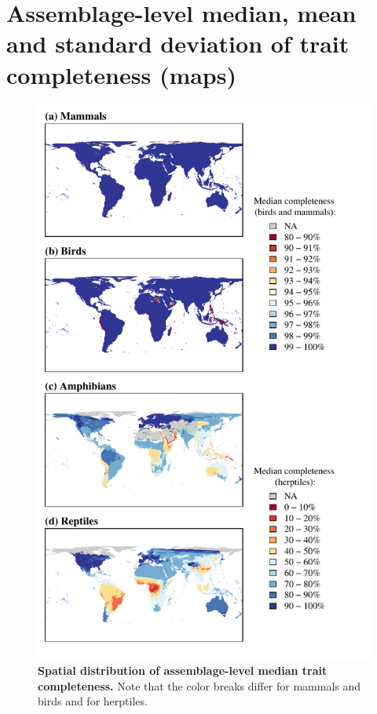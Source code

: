 \newpage
\pagebreak

\section{Assemblage-level median, mean and standard deviation of trait completeness (maps)}

\begin{figure}[h!]
\vspace*{-2cm}
\centering
\includegraphics[scale=0.95]{Supporting/Chapter2/Figures/Maps/Median_map}
\caption[Spatial distribution of assemblage-level median trait completeness in herptiles.]{\textbf{Spatial distribution of  assemblage-level median trait completeness.} Note that the color breaks differ for mammals and birds and for herptiles.}
\label{}
\end{figure}

